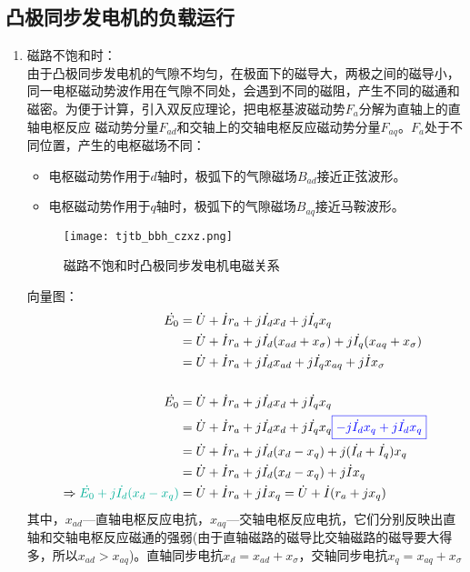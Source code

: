 \documentclass[blue]{elegantnote}
\begin{document}
\subsection{凸极同步发电机的负载运行}
\begin{enumerate}
	\item 磁路不饱和时：\\
	由于凸极同步发电机的气隙不均匀，在极面下的磁导大，两极之间的磁导小，同一电枢磁动势波作用在气隙不同处，会遇到不同的磁阻，产生不同的磁通和磁密。为便于计算，引入双反应理论，把电枢基波磁动势$F_a$分解为直轴上的直轴电枢反应 磁动势分量$F_{ad}$和交轴上的交轴电枢反应磁动势分量$F_{aq}$。$F_a$处于不同位置，产生的电枢磁场不同：
	\begin{itemize}
		\item 电枢磁动势作用于$d$轴时，极弧下的气隙磁场$B_{ad}$接近正弦波形。
		\item 电枢磁动势作用于$q$轴时，极弧下的气隙磁场$B_{aq}$接近马鞍波形。 
	\end{itemize} 
	\begin{figure}[!hbtp]
		\centering
		\texttt{[image: tjtb\_bbh\_czxz.png]}
		\caption{磁路不饱和时凸极同步发电机电磁关系}           \label{figur:tjtb_bbh_czxz}                           
	\end{figure}
	向量图：	
	\begin{align*}
	\dot{E_0}&=\dot{U}+\dot{I}r_a+j\dot{I_d}x_d+j\dot{I_q}x_q\\
	&=\dot{U}+\dot{I}r_a+j\dot{I_d}(x_{ad}+x_{\sigma})+j\dot{I_q}(x_{aq}+x_{\sigma})\\&=\dot{U}+\dot{I}r_a+j\dot{I_d}x_{ad}+j\dot{I_q}x_{aq}+j\dot{I}x_{\sigma}\\\\
	\dot{E_0}&=\dot{U}+\dot{I}r_a+j\dot{I_d}x_d+j\dot{I_q}x_q\\
	&=\dot{U}+\dot{I}r_a+j\dot{I_d}x_d+j\dot{I_q}x_q{\color{blue}\boxed{-j\dot{I_d}x_q+j\dot{I_d}x_q}}\\
	&=\dot{U}+\dot{I}r_a+j\dot{I_d}(x_d-x_q)+j(\dot{I_d}+\dot{I_q})x_q\\
	&=\dot{U}+\dot{I}r_a+j\dot{I_d}(x_d-x_q)+j\dot{I}x_q\\
	\Rightarrow {\color{thid}\dot{E_0}+j\dot{I_d}(x_d-x_q)}&= \dot{U}+\dot{I}r_a+j\dot{I}x_q=\dot{U}+\dot{I}(r_a+jx_q)
	\end{align*}
	其中，$x_{ad}$—直轴电枢反应电抗，$x_{aq}$—交轴电枢反应电抗，它们分别反映出直轴和交轴电枢反应磁通的强弱(由于直轴磁路的磁导比交轴磁路的磁导要大得多，所以$x_{ad}>x_{aq}$)。直轴同步电抗$x_d=x_{ad}+x_{\sigma}$，交轴同步电抗$x_q=x_{aq}+x_{\sigma}$

\end{enumerate}
\end{document}
